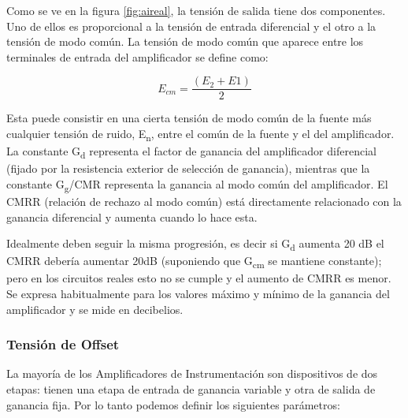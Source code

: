 Como se ve en la figura \ref{fig:aireal}, la tensión de salida tiene dos componentes. Uno de ellos es proporcional a la tensión de entrada diferencial y el otro a la tensión de modo común. La tensión de modo común que aparece entre los terminales de entrada del amplificador se define como: 

\begin{equation}\label{eq5}
E_{cm} = \frac{(E_{2}+E{1})}{2}
\end{equation}

Esta puede consistir en una cierta tensión de modo común de la fuente más cualquier tensión de ruido, E\textsubscript{n}, entre el común de la fuente y el del amplificador. La constante G\textsubscript{d} representa el factor de ganancia del amplificador diferencial (fijado por la resistencia exterior de selección de ganancia), mientras que la constante G\textsubscript{g}/CMR representa la ganancia al modo común del amplificador. El CMRR (relación de rechazo al modo común) está directamente relacionado con la ganancia diferencial y aumenta cuando lo hace esta. 

Idealmente deben seguir la misma progresión, es decir si G\textsubscript{d} aumenta 20 dB el CMRR debería aumentar 20dB (suponiendo que G\textsubscript{cm} se mantiene constante); pero en los circuitos reales esto no se cumple y el aumento de CMRR es menor. Se expresa habitualmente para los valores máximo y mínimo de la ganancia del amplificador y se mide en decibelios.


\subsubsection{Tensión de Offset} %
\label{tension_off}
La mayoría de los Amplificadores de Instrumentación son dispositivos de dos etapas: tienen una etapa de entrada de ganancia variable y otra de salida de ganancia fija. Por lo tanto podemos definir los siguientes parámetros:

